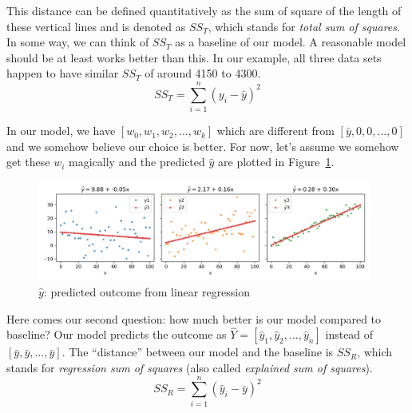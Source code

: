 \documentclass[
	letterpaper
]{article}
\begin{document}
This distance can be defined quantitatively as the sum of square of the length of these vertical lines and is denoted as $SS_T$, which stands for \textit{total sum of squares}.
In some way, we can think of $SS_T$ as a baseline of our model.
A reasonable model should be at least works better than this.
In our example, all three data sets happen to have similar $SS_T$ of around 4150 to 4300.
\begin{equation}
SS_T = \sum_{i = 1}^n (y_i - \bar y) ^2 
\end{equation}

In our model, we have $[w_0, w_1, w_2, ..., w_k]$ which are different from $[\bar y, 0, 0, ..., 0]$ and we somehow believe our choice is better.
For now, let's assume we somehow get these $w_i$ magically and the predicted $\hat y$ are plotted in Figure~\ref{fig:yhat}.
\begin{figure}[htbp]
	\centering
	\includegraphics[width=0.98\textwidth]{figures/comparison-yhat.png}
	\caption{$\hat y$: predicted outcome from linear regression}
	\label{fig:yhat}
\end{figure}

Here comes our second question: how much better is our model compared to baseline?
Our model predicts the outcome as $\hat Y = [\hat y_1, \hat y_2, ..., \hat y_n]$ instead of $[\bar y, \bar y, ..., \bar y]$.
The ``distance'' between our model and the baseline is $SS_R$, which stands for \textit{regression sum of squares} (also called \textit{explained sum of squares}).
\begin{equation}
SS_R= \sum_{i = 1}^n (\hat y_i - \bar y) ^2 
\end{equation}
\end{document}

